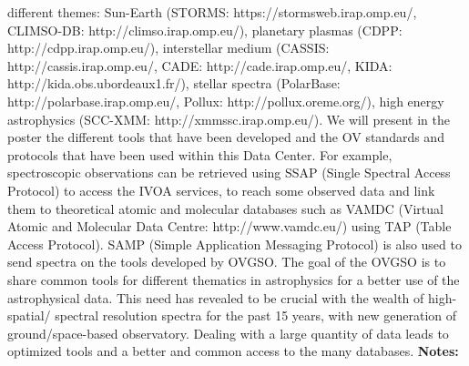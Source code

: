 \documentclass{report}
\begin{document}
{{{{{{{{{{{{{{{{{{{{{{{{{{{{{{{{{{{{{{{{{{{{{{{{{{{{{{{{{{{{{{{{{{{{{{{{{{{{{{{{{{{{{{{{{{{{{{{{{{{{{{{{{{{{{{{{{{{{{{{{{{{{{{{{{{{{{{{{{{{{{{{{{{{{{{{{{{{{{{{{{{{{{{{different themes: Sun-Earth (STORMS: https://stormsweb.irap.omp.eu/, CLIMSO-DB: http://climso.irap.omp.eu/), planetary plasmas (CDPP: http://cdpp.irap.omp.eu/), interstellar medium (CASSIS: http://cassis.irap.omp.eu/, CADE: http://cade.irap.omp.eu/, KIDA: http://kida.obs.ubordeaux1.fr/), stellar spectra (PolarBase: http://polarbase.irap.omp.eu/, Pollux: http://pollux.oreme.org/), high energy astrophysics (SCC-XMM: http://xmmssc.irap.omp.eu/). We will present in the poster the different tools that have been developed and the OV standards and protocols that have been used within this Data Center. For example, spectroscopic observations can be retrieved using SSAP (Single Spectral Access Protocol) to access the IVOA services, to reach some observed data and link them to theoretical atomic and molecular databases such as VAMDC (Virtual Atomic and Molecular Data Centre: http://www.vamdc.eu/) using TAP (Table Access Protocol).
SAMP (Simple Application Messaging Protocol) is also used to send spectra on the tools developed by OVGSO.
The goal of the OVGSO is to share common tools for different thematics in astrophysics for a better use of the astrophysical data. This need has revealed to be crucial with the wealth of high-spatial/
spectral resolution spectra for the past 15 years, with new generation of ground/space-based observatory. Dealing with a large quantity of data leads to optimized tools and a better and common access to the many databases.\newline
{\bf Notes:}\newline
{\newpage
}}}}}}}}}}}}}}}}}}}}}}}}}}}}}}}}}}}}}}}}}}}}}}}}}}}}}}}}}}}}}}}}}}}}}}}}}}}}}}}}}}}}}}}}}}}}}}}}}}}}}}}}}}}}}}}}}}}}}}}}}}}}}}}}}}}}}}}}}}}}}}}}}}}}}}}}}}}}}}}}}}}}}}}}
\end{document}
